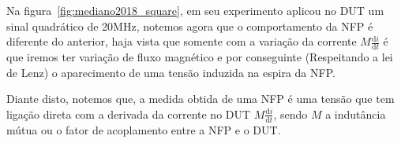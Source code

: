 Na figura~\ref{fig:mediano2018_square}, em seu experimento  aplicou no DUT um sinal quadrático de 20MHz, notemos agora que o comportamento da NFP é diferente do anterior, haja vista que somente com a variação da corrente $M \frac{\mathrm{d} i}{\mathrm{d} t}$ é que iremos ter variação de fluxo magnético e por conseguinte (Respeitando a lei de Lenz) o aparecimento de uma tensão induzida na espira da NFP.

Diante disto, notemos que, a medida obtida de uma NFP é uma tensão que tem ligação direta com a derivada da corrente no DUT $M \frac{\mathrm{d} i}{\mathrm{d} t}$, sendo $M$ a indutância mútua ou o fator de acoplamento entre a NFP e o DUT.

